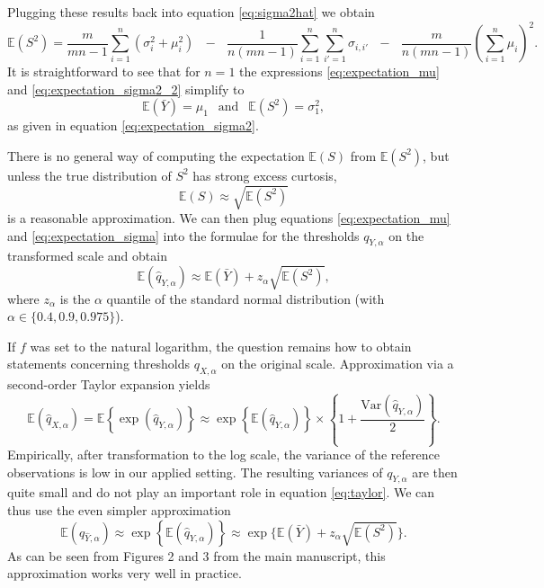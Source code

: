 \documentclass{article}
\begin{document}
Plugging these results back into equation \eqref{eq:sigma2hat} we obtain
\begin{equation}
\mathbb{E}(S^2) = \frac{m}{mn - 1} \sum_{i = 1}^n (\sigma_{i}^2 + \mu_i^2) \ \ \ - \ \ \ \frac{1}{n(mn - 1)} \sum_{i = 1}^n \sum_{i' = 1}^n \sigma_{i,i'} \ \ \ - \ \ \ \frac{m}{n(mn - 1)}\left(\sum_{i = 1}^n \mu_i\right)^2.
\label{eq:expectation_sigma2_2}
\end{equation}
It is straightforward to see that for $n = 1$ the expressions \eqref{eq:expectation_mu} and \eqref{eq:expectation_sigma2_2} simplify to
$$
\mathbb{E}(\bar{Y}) = \mu_1 \ \ \text{ and } \ \ \mathbb{E}(S^2) = \sigma^2_1,
$$
as given in equation \eqref{eq:expectation_sigma2}.

There is no general way of computing the expectation $\mathbb{E}(S)$ from $\mathbb{E}(S^2)$, but unless the true distribution of  $S^2$ has strong excess curtosis,
\begin{equation}
\mathbb{E}(S) \approx \sqrt{\mathbb{E}(S^2)}
\label{eq:expectation_sigma}
\end{equation}
is a reasonable approximation. We can then plug equations \eqref{eq:expectation_mu} and \eqref{eq:expectation_sigma} into the formulae for the thresholds $q_{Y, \alpha}$ on the transformed scale and obtain
$$
\mathbb{E}(\hat{q}_{Y, \alpha}) \approx \mathbb{E}(\bar{Y}) + z_\alpha \sqrt{\mathbb{E}(S^2)},
$$
where $z_\alpha$ is the $\alpha$ quantile of the standard normal distribution (with $\alpha \in \{0.4, 0.9, 0.975\}$).

If $f$ was set to the natural logarithm, the question remains how to obtain statements concerning thresholds $q_{X, \alpha}$ on the original scale. Approximation via a second-order Taylor expansion yields
\begin{equation}
\mathbb{E}(\hat{q}_{X, \alpha}) = \mathbb{E}\left\{\exp(\hat{q}_{Y, \alpha})\right\} \approx \exp\left\{\mathbb{E}(\hat{q}_{Y, \alpha})\right\} \times \left\{1 + \frac{\text{Var}(\hat{q}_{Y, \alpha})}{2} \right\}.
\label{eq:taylor}
\end{equation}
Empirically, after transformation to the log scale, the variance of the reference observations is low in our applied setting. The resulting variances of $q_{Y, \alpha}$ are then quite small and do not play an important role in equation \eqref{eq:taylor}. We can thus use the even simpler approximation
\begin{equation}
\mathbb{E}(q_{\hat{Y}, \alpha}) \approx \exp\left\{\mathbb{E}(\hat{q}_{Y, \alpha})\right\} \approx \exp\{\mathbb{E}(\bar{Y}) + z_\alpha \sqrt{\mathbb{E}(S^2)}\}.
\end{equation}
As can be seen from Figures 2 and 3 from the main manuscript, this approximation works very well in practice. %
\end{document}
